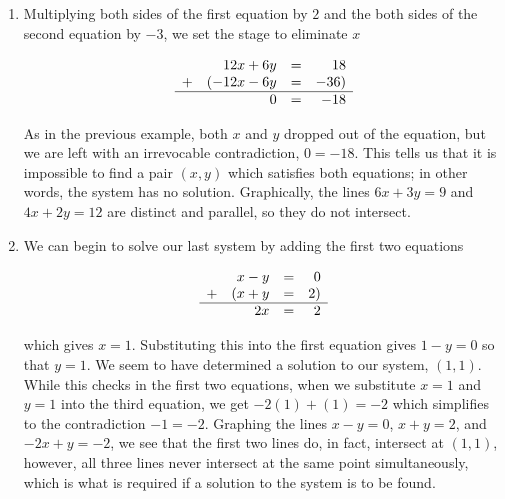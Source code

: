 \documentclass{ximera}
\begin{document}
\begin{ex}
\begin{enumerate}
\begin{center}
\begin{tabular}{m{.5in}m{2in}m{.5in}m{2in}}
\\

\end{tabular}

\end{center}

\item  Multiplying both sides of the first equation by $2$ and the both sides of the second equation by $-3$, we set the stage to eliminate $x$ 

\setlength{\extrarowheight}{2pt}
\[ \begin{array}{lrcr} & 12x + 6y & = & 18  \\ + & (-12x-6y  & = & -36 ) \\ \hline  & 0 & = & -18 \end{array}\] 
\setlength{\extrarowheight}{0pt}

As in the previous example, both $x$ and $y$ dropped out of the equation, but we are left with an irrevocable contradiction, $0 = -18$. This tells us that it is impossible to find a pair $(x,y)$ which satisfies both equations; in other words, the system has no solution.  Graphically, the lines  $6x + 3y =9$ and  $4x + 2y = 12$ are distinct and parallel, so they do not intersect.

\item  We can begin to solve our last system by adding the first two equations  

\setlength{\extrarowheight}{2pt}
\[ \begin{array}{lrcr} & x - y & = & 0  \\ + & (x + y & = & 2 ) \\ \hline  & 2x & = & 2 \end{array}\]  
\setlength{\extrarowheight}{0pt}

which gives $x = 1$.  Substituting this into the first equation gives $1 - y = 0$ so that $y = 1$.  We seem to have determined a solution to our system, $(1,1)$.  While this checks in the first two equations, when we substitute $x=1$ and $y=1$ into the third equation, we get $-2(1) + (1) = -2$ which simplifies to the contradiction $-1 = -2$.  Graphing the lines $x-y=0$, $x+y = 2$, and $-2x+y=-2$, we see that the first two lines do, in fact, intersect at $(1,1)$, however, all three lines never intersect at the same point simultaneously, which is what is required if a solution to the system is to be found.

\begin{center}

\begin{tabular}{m{.5in}m{2in}m{.5in}m{2in}}


\end{tabular}
\end{center}
\end{enumerate}
\end{ex}
\end{document}
